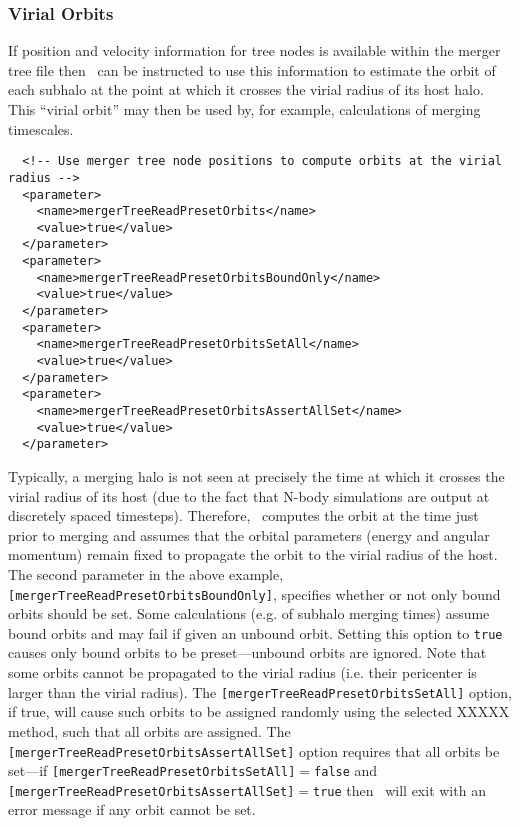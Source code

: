 \subsubsection{Virial Orbits}

If position and velocity information for tree nodes is available within the merger tree file then \glc\ can be instructed to use this information to estimate the orbit of each subhalo at the point at which it crosses the virial radius of its host halo. This ``virial orbit'' may then be used by, for example, calculations of merging timescales.
\begin{verbatim}
  <!-- Use merger tree node positions to compute orbits at the virial radius -->
  <parameter>
    <name>mergerTreeReadPresetOrbits</name>
    <value>true</value>
  </parameter>
  <parameter>
    <name>mergerTreeReadPresetOrbitsBoundOnly</name>
    <value>true</value>
  </parameter>
  <parameter>
    <name>mergerTreeReadPresetOrbitsSetAll</name>
    <value>true</value>
  </parameter>
  <parameter>
    <name>mergerTreeReadPresetOrbitsAssertAllSet</name>
    <value>true</value>
  </parameter>
\end{verbatim}
Typically, a merging halo is not seen at precisely the time at which it crosses the virial radius of its host (due to the fact that N-body simulations are output at discretely spaced timesteps). Therefore, \glc\ computes the orbit at the time just prior to merging and assumes that the orbital parameters (energy and angular momentum) remain fixed to propagate the orbit to the virial radius of the host. The second parameter in the above example, {\tt [mergerTreeReadPresetOrbitsBoundOnly]}, specifies whether or not only bound orbits should be set. Some calculations (e.g. of subhalo merging times) assume bound orbits and may fail if given an unbound orbit. Setting this option to {\tt true} causes only bound orbits to be preset---unbound orbits are ignored. Note that some orbits cannot be propagated to the virial radius (i.e. their pericenter is larger than the virial radius). The {\tt [mergerTreeReadPresetOrbitsSetAll]} option, if true, will cause such orbits to be assigned randomly using the selected XXXXX method, such that all orbits are assigned. The {\tt [mergerTreeReadPresetOrbitsAssertAllSet]} option requires that all orbits be set---if {\tt [mergerTreeReadPresetOrbitsSetAll]}$=${\tt false} and {\tt [mergerTreeReadPresetOrbitsAssertAllSet]}$=${\tt true} then \glc\ will exit with an error message if any orbit cannot be set.

